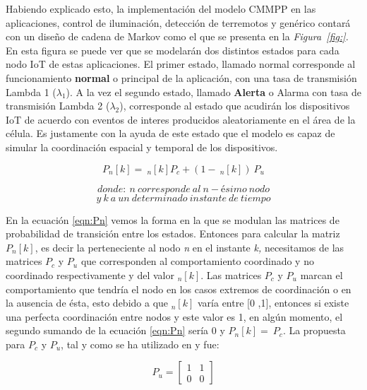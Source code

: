 Habiendo explicado esto, la implementación del modelo CMMPP en las aplicaciones, control de iluminación, detección de terremotos y genérico contará con un diseño de cadena de Markov como el que se presenta en la \textit{Figura~\ref{fig:}. }En esta figura se puede ver que se modelarán dos distintos estados para cada nodo IoT de estas aplicaciones. El primer estado, llamado normal corresponde al funcionamiento \textbf{normal} o principal de la aplicación, con una tasa de transmisión Lambda 1 (${\lambda }_1$). A la vez el segundo estado, llamado \textbf{Alerta} o Alarma con tasa de transmisión Lambda 2 (${\lambda }_2$), corresponde al estado que acudirán los dispositivos IoT de acuerdo con eventos de interes producidos aleatoriamente en el área de la célula. Es justamente con la ayuda de este estado que el modelo es capaz de simular la coordinación espacial y temporal de los dispositivos.

\begin{equation}
P_n\left[k\right]=\ _n\left[k\right] P_c+\left(1-\ _n\left[k\right]\right)\ P_u 
\label{eqn:Pn}
\end{equation}

\[donde:\ n\ corresponde\ al\ n-\textrm{é}simo\ nodo\] 
\[y\ k\ a\ un\ determinado\ instante\ de\ tiempo\] 

En la ecuación \ref{eqn:Pn} vemos la forma en la que se modulan las matrices de probabilidad de transición entre los estados. Entonces para calcular la matriz $P_n\left[k\right]$, es decir la perteneciente al nodo \textit{n }en el instante \textit{k, }necesitamos de las matrices $P_c$ y $P_u$ que corresponden al comportamiento coordinado y no coordinado respectivamente y del valor $_n\left[k\right]$. Las matrices $P_c$ y $P_u$ marcan el comportamiento que tendría el nodo en los casos extremos de coordinación o en la ausencia de ésta, esto debido a que $_n\left[k\right]$ varía entre [0 ,1], entonces si existe una perfecta coordinación entre nodos y este valor es 1, en algún momento, el segundo sumando de la ecuación \ref{eqn:Pn} sería 0 y $P_n\left[k\right]=\ P_c$. La propuesta para $P_c$ y $P_u$, tal y como se ha utilizado en \parencite{Gupta2018} y \parencite{Smiljkovic2014} fue:

\begin{equation}
P_{u} =  
\begin{bmatrix}
1 & 1 \\
0 & 0 
\end{bmatrix}
\end{equation}

